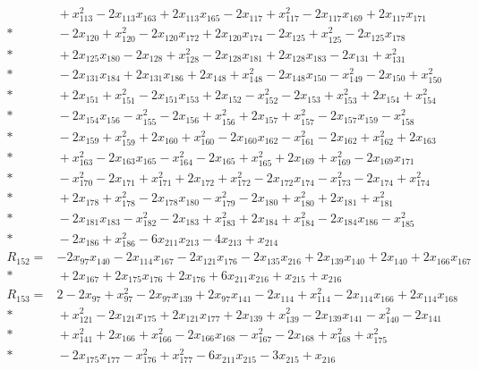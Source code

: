 \begin{align*}
&{} + x_{113}^{2} - 2x_{113}x_{163} + 2x_{113}x_{165} - 2x_{117} + x_{117}^{2} - 2x_{117}x_{169} + 2x_{117}x_{171} \\*
&{} - 2x_{120} + x_{120}^{2} - 2x_{120}x_{172} + 2x_{120}x_{174} - 2x_{125} + x_{125}^{2} - 2x_{125}x_{178} \\*
&{} + 2x_{125}x_{180} - 2x_{128} + x_{128}^{2} - 2x_{128}x_{181} + 2x_{128}x_{183} - 2x_{131} + x_{131}^{2} \\*
&{} - 2x_{131}x_{184} + 2x_{131}x_{186} + 2x_{148} + x_{148}^{2} - 2x_{148}x_{150} - x_{149}^{2} - 2x_{150} + x_{150}^{2} \\*
&{} + 2x_{151} + x_{151}^{2} - 2x_{151}x_{153} + 2x_{152} - x_{152}^{2} - 2x_{153} + x_{153}^{2} + 2x_{154} + x_{154}^{2} \\*
&{} - 2x_{154}x_{156} - x_{155}^{2} - 2x_{156} + x_{156}^{2} + 2x_{157} + x_{157}^{2} - 2x_{157}x_{159} - x_{158}^{2} \\*
&{} - 2x_{159} + x_{159}^{2} + 2x_{160} + x_{160}^{2} - 2x_{160}x_{162} - x_{161}^{2} - 2x_{162} + x_{162}^{2} + 2x_{163} \\*
&{} + x_{163}^{2} - 2x_{163}x_{165} - x_{164}^{2} - 2x_{165} + x_{165}^{2} + 2x_{169} + x_{169}^{2} - 2x_{169}x_{171} \\*
&{} - x_{170}^{2} - 2x_{171} + x_{171}^{2} + 2x_{172} + x_{172}^{2} - 2x_{172}x_{174} - x_{173}^{2} - 2x_{174} + x_{174}^{2} \\*
&{} + 2x_{178} + x_{178}^{2} - 2x_{178}x_{180} - x_{179}^{2} - 2x_{180} + x_{180}^{2} + 2x_{181} + x_{181}^{2} \\*
&{} - 2x_{181}x_{183} - x_{182}^{2} - 2x_{183} + x_{183}^{2} + 2x_{184} + x_{184}^{2} - 2x_{184}x_{186} - x_{185}^{2} \\*
&{} - 2x_{186} + x_{186}^{2} - 6x_{211}x_{213} - 4x_{213} + x_{214} \\[4pt]
R_{152} ={}& -2x_{97}x_{140} - 2x_{114}x_{167} - 2x_{121}x_{176} - 2x_{135}x_{216} + 2x_{139}x_{140} + 2x_{140} + 2x_{166}x_{167} \\*
&{} + 2x_{167} + 2x_{175}x_{176} + 2x_{176} + 6x_{211}x_{216} + x_{215} + x_{216} \\[4pt]
R_{153} ={}& 2 - 2x_{97} + x_{97}^{2} - 2x_{97}x_{139} + 2x_{97}x_{141} - 2x_{114} + x_{114}^{2} - 2x_{114}x_{166} + 2x_{114}x_{168} \\*
&{} + x_{121}^{2} - 2x_{121}x_{175} + 2x_{121}x_{177} + 2x_{139} + x_{139}^{2} - 2x_{139}x_{141} - x_{140}^{2} - 2x_{141} \\*
&{} + x_{141}^{2} + 2x_{166} + x_{166}^{2} - 2x_{166}x_{168} - x_{167}^{2} - 2x_{168} + x_{168}^{2} + x_{175}^{2} \\*
&{} - 2x_{175}x_{177} - x_{176}^{2} + x_{177}^{2} - 6x_{211}x_{215} - 3x_{215} + x_{216}
\end{align*}
\endgroup
